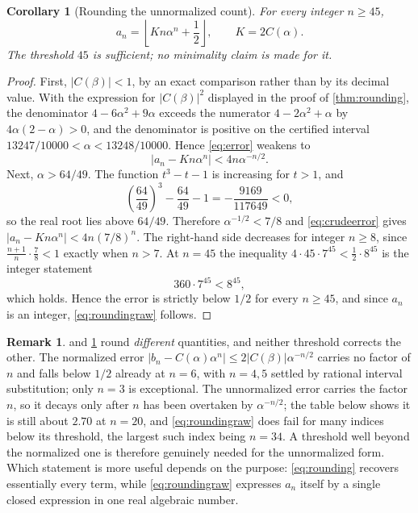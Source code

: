 \documentclass[11pt,letterpaper]{article}
\numberwithin{equation}{section}
\newtheorem{corollary}[theorem]{Corollary}
\theoremstyle{definition}
\newtheorem{remark}[theorem]{Remark}
\newcommand{\1}{\mathbf 1}
\begin{document}
\begin{corollary}[Rounding the unnormalized count]\label{cor:roundingraw}
For every integer $n\ge45$,
\begin{equation}\label{eq:roundingraw}
 a_n=\left\lfloor Kn\alpha^n+\frac12\right\rfloor,
 \qquad K=2C(\alpha).
\end{equation}
The threshold $45$ is sufficient; no minimality claim is made for it.
\end{corollary}
\begin{proof}
First, $|C(\beta)|<1$, by an exact comparison rather than by its decimal value.
With the expression for $|C(\beta)|^2$ displayed in the proof of
\cref{thm:rounding}, the denominator $4-6\alpha^2+9\alpha$ exceeds the
numerator $4-2\alpha^2+\alpha$ by $4\alpha(2-\alpha)>0$, and the denominator is
positive on the certified interval $13247/10000<\alpha<13248/10000$.
Hence \eqref{eq:error} weakens to
\begin{equation}\label{eq:crudeerror}
 |a_n-Kn\alpha^n|<4n\alpha^{-n/2}.
\end{equation}
Next, $\alpha>64/49$. The function $t^3-t-1$ is increasing for $t>1$, and
\[
 \left(\frac{64}{49}\right)^{3}-\frac{64}{49}-1=-\frac{9169}{117649}<0,
\]
so the real root lies above $64/49$. Therefore $\alpha^{-1/2}<7/8$ and
\eqref{eq:crudeerror} gives $|a_n-Kn\alpha^n|<4n(7/8)^n$. The right-hand side
decreases for integer $n\ge8$, since $\frac{n+1}{n}\cdot\frac78<1$ exactly when
$n>7$. At $n=45$ the inequality $4\cdot45\cdot7^{45}<\tfrac12\cdot8^{45}$ is the
integer statement
\begin{equation}\label{eq:integercertificate}
 360\cdot7^{45}<8^{45},
\end{equation}
which holds. Hence the error is strictly below $1/2$ for every $n\ge45$, and
since $a_n$ is an integer, \eqref{eq:roundingraw} follows.
\end{proof}

\begin{remark}\label{rem:twothresholds}
 and \cref{cor:roundingraw} round \emph{different}
quantities, and neither threshold corrects the other. The normalized error
$|b_n-C(\alpha)\alpha^n|\le2|C(\beta)|\alpha^{-n/2}$ carries no factor of $n$
and falls below $1/2$ already at $n=6$, with $n=4,5$ settled by rational
interval substitution; only $n=3$ is exceptional. The unnormalized error
carries the factor $n$, so it decays only after $n$ has been overtaken by
$\alpha^{-n/2}$; the table below shows it is still about $2.70$ at $n=20$, and
\eqref{eq:roundingraw} does fail for many indices below its threshold, the
largest such index being $n=34$. A threshold well beyond the normalized one is
therefore genuinely needed for the unnormalized form. Which statement is more
useful depends on the purpose: \eqref{eq:rounding} recovers essentially every
term, while \eqref{eq:roundingraw} expresses $a_n$ itself by a single closed
expression in one real algebraic number.
\end{remark}
\end{document}
